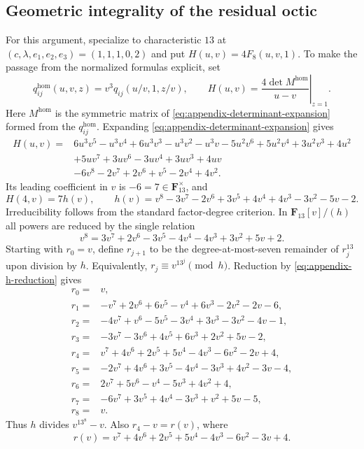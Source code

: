\subsection{Geometric integrality of the residual octic}
\label{app:residual-octic-certificate}
For this argument, specialize to characteristic $13$ at
$(c,\lambda,e_1,e_2,e_3)=(1,1,1,0,2)$ and put
$H(u,v)=4F_8(u,v,1)$.  To make the passage from the normalized formulas
explicit, set
\[
 q_{ij}^{\mathrm{hom}}(u,v,z)
   =v^3q_{ij}(u/v,1,z/v),\qquad
 H(u,v)=
 \left.\frac{4\det M^{\mathrm{hom}}}{u-v}\right|_{z=1}.
\]
Here $M^{\mathrm{hom}}$ is the symmetric matrix of
\eqref{eq:appendix-determinant-expansion} formed from the
$q_{ij}^{\mathrm{hom}}$.  Expanding
\eqref{eq:appendix-determinant-expansion} gives
\begin{align*}
H(u,v)={}&6u^3v^5-u^3v^4+6u^3v^3-u^3v^2-u^3v
 -5u^2v^6+5u^2v^4+3u^2v^3+4u^2\\
&+5uv^7+3uv^6-3uv^4+3uv^3+4uv\\
&-6v^8-2v^7+2v^6+v^5-2v^4+4v^2.
\end{align*}
Its leading coefficient in $v$ is $-6=7\in\mathbf F_{13}^\times$, and
\[
 H(4,v)=7h(v),
 \qquad
 h(v)=v^8-3v^7-2v^6+3v^5+4v^4+4v^3-3v^2-5v-2.
\]
Irreducibility follows from the standard factor-degree criterion.  In
$\mathbf F_{13}[v]/(h)$ all powers are reduced by the single relation
\begin{equation}
 v^8=3v^7+2v^6-3v^5-4v^4-4v^3+3v^2+5v+2.
\label{eq:appendix-h-reduction}
\end{equation}
Starting with $r_0=v$, define $r_{j+1}$ to be the degree-at-most-seven
remainder of $r_j^{13}$ upon division by $h$.  Equivalently,
$r_j\equiv v^{13^j}\pmod h$.  Reduction by
\eqref{eq:appendix-h-reduction} gives
\begin{align*}
r_0={}&v,\\
r_1={}&-v^7+2v^6+6v^5-v^4+6v^3-2v^2-2v-6,\\
r_2={}&-4v^7+v^6-5v^5-3v^4+3v^3-3v^2-4v-1,\\
r_3={}&-3v^7-3v^6+4v^5+6v^3+2v^2+5v-2,\\
r_4={}&v^7+4v^6+2v^5+5v^4-4v^3-6v^2-2v+4,\\
r_5={}&-2v^7+4v^6+3v^5-4v^4-3v^3+4v^2-3v-4,\\
r_6={}&2v^7+5v^6-v^4-5v^3+4v^2+4,\\
r_7={}&-6v^7+3v^5+4v^4-3v^3+v^2+5v-5,\\
r_8={}&v.
\end{align*}
Thus $h$ divides $v^{13^8}-v$.  Also $r_4-v=r(v)$, where
\[
 r(v)=v^7+4v^6+2v^5+5v^4-4v^3-6v^2-3v+4.
\]
